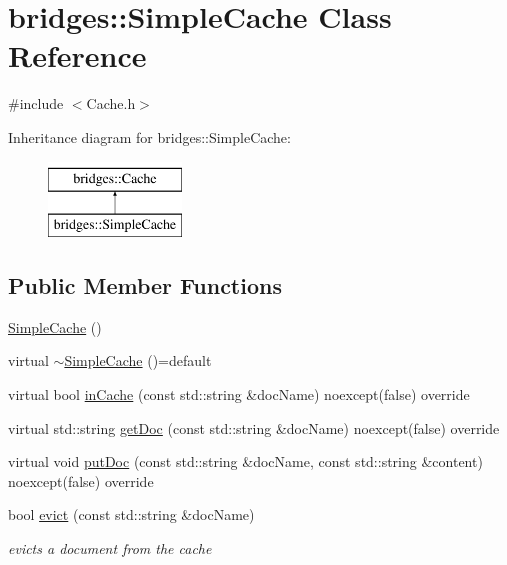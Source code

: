 \hypertarget{classbridges_1_1_simple_cache}{}\section{bridges\+:\+:Simple\+Cache Class Reference}
\label{classbridges_1_1_simple_cache}


{\ttfamily \#include $<$Cache.\+h$>$}

Inheritance diagram for bridges\+:\+:Simple\+Cache\+:\begin{figure}[H]
\begin{center}
\leavevmode
\includegraphics[height=2.000000cm]{classbridges_1_1_simple_cache}
\end{center}
\end{figure}
\subsection*{Public Member Functions}
\begin{DoxyCompactItemize}
\item 
\hyperlink{classbridges_1_1_simple_cache_af6454edafca975489988b8df61d1cd2a}{Simple\+Cache} ()
\item 
virtual \hyperlink{classbridges_1_1_simple_cache_a2eabd8176ed5078f411f67188881d721}{$\sim$\+Simple\+Cache} ()=default
\item 
virtual bool \hyperlink{classbridges_1_1_simple_cache_a9af328045bad7c3bd4ed6cf99352bf07}{in\+Cache} (const std\+::string \&doc\+Name) noexcept(false) override
\item 
virtual std\+::string \hyperlink{classbridges_1_1_simple_cache_a905ad2e7fb1b6784a5f70caf024b157f}{get\+Doc} (const std\+::string \&doc\+Name) noexcept(false) override
\item 
virtual void \hyperlink{classbridges_1_1_simple_cache_a61264b1080a4458d6210c7cf6b4e8615}{put\+Doc} (const std\+::string \&doc\+Name, const std\+::string \&content) noexcept(false) override
\item 
bool \hyperlink{classbridges_1_1_simple_cache_a1a676acaaecd1e5368a3d51a654d93bc}{evict} (const std\+::string \&doc\+Name)
\begin{DoxyCompactList}\small\item\em evicts a document from the cache \end{DoxyCompactList}\end{DoxyCompactItemize}


